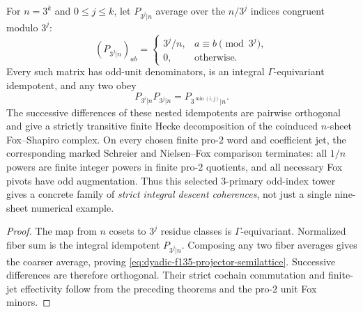 \begin{corollary}
\label{cor:dyadic-f135-all-threepower-coherence}
For $n=3^k$ and
$0\le j\le k$,
let $P_{3^j|n}$
average over the
$n/3^j$ indices
congruent modulo
$3^j$:
\begin{equation}\label{eq:dyadic-f135-all-threepower-projectors}
(P_{3^j|n})_{ab}
=\begin{cases}
3^j/n,&a\equiv b\pmod{3^j},\\
0,&\text{otherwise}.
\end{cases}
\end{equation}
Every such matrix
has odd-unit
denominators,
is an integral
$\Gamma$-equivariant
idempotent,
and any two obey
\begin{equation}\label{eq:dyadic-f135-projector-semilattice}
\boxed{\qquad
P_{3^i|n}P_{3^j|n}
=P_{3^{\min(i,j)}|n}.
\qquad}
\end{equation}
The successive
differences of
these nested
idempotents are
pairwise orthogonal
and give a
strictly transitive
finite Hecke
decomposition of
the coinduced
$n$-sheet
Fox--Shapiro
complex.
On every chosen
finite pro-$2$
word and
coefficient jet,
the corresponding
marked Schreier
and Nielsen--Fox
comparison
terminates:
all $1/n$
powers are finite
integer powers
in finite
pro-$2$ quotients,
and all necessary
Fox pivots have
odd augmentation.
Thus this selected
$3$-primary odd-index
tower gives a
concrete family
of \emph{strict
integral descent
coherences},
not just a
single nine-sheet
numerical example.
\end{corollary}

\begin{proof}
The map from
$n$ cosets to
$3^j$ residue
classes is
$\Gamma$-equivariant.
Normalized fiber
sum is the
integral idempotent
$P_{3^j|n}$.
Composing any
two fiber
averages gives
the coarser
average, proving
\eqref{eq:dyadic-f135-projector-semilattice}.
Successive
differences are
therefore
orthogonal.
Their strict
cochain
commutation and
finite-jet
effectivity
follow from
the preceding
theorems and
the pro-$2$
unit Fox
minors.
\end{proof}

